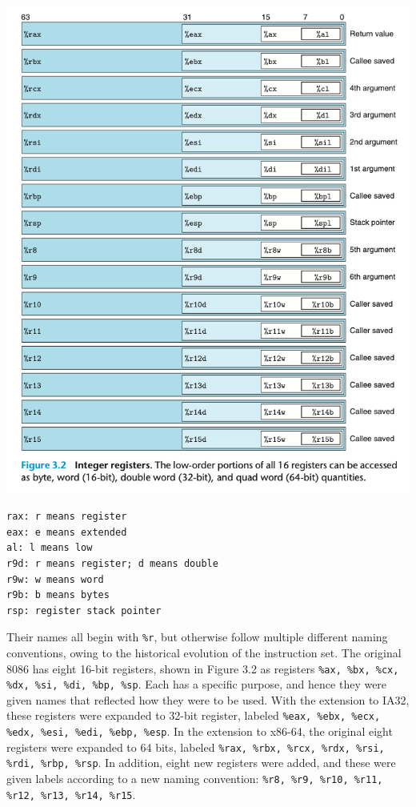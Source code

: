 \documentclass[11pt]{article}
\begin{document}
\begin{center}
\includegraphics[width=.9\linewidth]{pics/integer-registers.png}
\end{center}

\begin{verbatim}
rax: r means register
eax: e means extended
al: l means low
r9d: r means register; d means double
r9w: w means word
r9b: b means bytes
rsp: register stack pointer
\end{verbatim}

Their names all begin with \texttt{\%r}, but otherwise follow multiple different naming conventions, owing to the historical evolution of the instruction set. The original 8086 has eight 16-bit registers, shown in Figure 3.2 as registers \texttt{\%ax, \%bx, \%cx, \%dx, \%si, \%di, \%bp, \%sp}. Each has a specific purpose, and hence they were given names that reflected how they were to be used. With the extension to IA32, these registers were expanded to 32-bit register, labeled \texttt{\%eax, \%ebx, \%ecx, \%edx, \%esi, \%edi, \%ebp, \%esp}. In the extension to x86-64, the original eight registers were expanded to 64 bits, labeled \texttt{\%rax, \%rbx, \%rcx, \%rdx, \%rsi, \%rdi, \%rbp, \%rsp}. In addition, eight new registers were added, and these were given labels according to a new naming convention: \texttt{\%r8, \%r9, \%r10, \%r11, \%r12, \%r13, \%r14, \%r15}.\\
\end{document}
